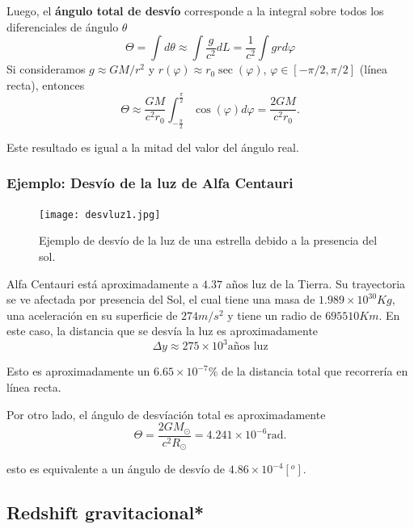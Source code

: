Luego, el \textbf{ángulo total de desvío} corresponde a la integral sobre todos los diferenciales de ángulo $\theta$
\begin{equation}
\Theta = \int d\theta \approx \int \frac{g}{c^2}dL = \frac{1}{c^2}\int g r d\varphi
\end{equation}
Si consideramos $g\approx GM/r^2$ y $r(\varphi)\approx r_{0}\sec(\varphi)$, $\varphi\in [-\pi/2,\pi/2]$ (línea recta), entonces
\begin{equation}
\Theta \approx \frac{GM}{c^2r_{0}}\int_{-\frac{\pi}{2}}^{\frac{\pi}{2}}\cos(\varphi)d\varphi = \frac{2GM}{c^2r_{0}}.
\end{equation}

Este resultado es igual a la mitad del valor del ángulo real.

\subsubsection{Ejemplo: Desvío de la luz de Alfa Centauri}
\begin{figure}[h!]
    \centering
    \texttt{[image: desvluz1.jpg]}
    \caption{Ejemplo de desvío de la luz de una estrella debido a la presencia del sol.}
    \label{DensidadRelativista}
\end{figure}
Alfa Centauri está aproximadamente a $4.37$ años luz de la Tierra. Su trayectoria se ve afectada por presencia del Sol, el cual tiene una masa de $1.989\times  10^{30}Kg$, una aceleración en su superficie de $274m/s^2$ y tiene un radio de $695510Km$. En este caso, la distancia que se desvía la luz es aproximadamente
\begin{equation}
\Delta y \approx 275\times  10^{3} \text{años luz}
\end{equation}

Esto es aproximadamente un $6.65\times  10^{-7}\%$ de la distancia total que recorrería en línea recta.
\par
Por otro lado, el ángulo de desvíación total es aproximadamente 
\begin{equation}
    \Theta=\frac{2GM_{\odot}}{c^2R_{\odot}}=4.241\times  10^{-6} \text{rad.}
\end{equation}

esto es equivalente a un ángulo de desvío de $4.86\times  10^{-4}[^{o}]$.

\subsection{Redshift gravitacional*}
 
